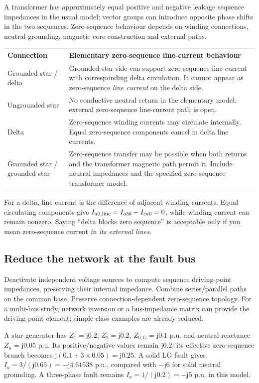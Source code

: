 \documentclass[11pt,a4paper]{article}
\newenvironment{Worked}[1]{\begin{tcolorbox}[breakable=false,colback=white,colframe=teal,colbacktitle=pale,coltitle=ink,title={#1}]}{\end{tcolorbox}}
\newcommand{\jj}{\mathrm j}
\begin{document}
A transformer has approximately equal positive and negative leakage sequence impedances in the usual model; vector groups can introduce opposite phase shifts in the two sequences. Zero-sequence behaviour depends on winding connections, neutral grounding, magnetic core construction and external paths.
\begin{center}\small
\begin{tabularx}{\textwidth}{L{.29\textwidth}Y}
\toprule Connection & Elementary zero-sequence line-current behaviour\\\midrule
Grounded star / delta & Grounded-star side can support zero-sequence line current with corresponding delta circulation. It cannot appear as zero-sequence \emph{line current} on the delta side.\\
Ungrounded star & No conductive neutral return in the elementary model: external zero-sequence line-current path is open.\\
Delta & Zero-sequence winding currents may circulate internally. Equal zero-sequence components cancel in delta line currents.\\
Grounded star / grounded star & Zero-sequence transfer may be possible when both returns and the transformer magnetic path permit it. Include neutral impedances and the specified zero-sequence transformer model.\\\bottomrule
\end{tabularx}\end{center}
For a delta, line current is the difference of adjacent winding currents. Equal circulating components give $I_{a0,\rm line}=I_{ab0}-I_{ca0}=0$, while winding current can remain nonzero. Saying ``delta blocks zero sequence'' is acceptable only if you mean zero-sequence current \emph{in its external lines}.

\subsection{Reduce the network at the fault bus}
Deactivate independent voltage sources to compute sequence driving-point impedances, preserving their internal impedance. Combine series/parallel paths on the common base. Preserve connection-dependent zero-sequence topology. For a multi-bus study, network inversion or a bus-impedance matrix can provide the driving-point element; simple class examples are already reduced.
\begin{Worked}{Additional example: grounding changes only the required branch}
A star generator has $Z_1=\jj0.2$, $Z_2=\jj0.2$, $Z_{0,G}=\jj0.1$ p.u. and neutral reactance $Z_n=\jj0.05$ p.u. Its positive/negative values remain $\jj0.2$; its effective zero-sequence branch becomes $\jj(0.1+3\times0.05)=\jj0.25$. A solid LG fault gives $I_a=3/(\jj0.65)=-\jj4.61538$ p.u., compared with $-\jj6$ for solid neutral grounding. A three-phase fault remains $I_a=1/(\jj0.2)=-\jj5$ p.u. in this model.
\end{Worked}
\end{document}
